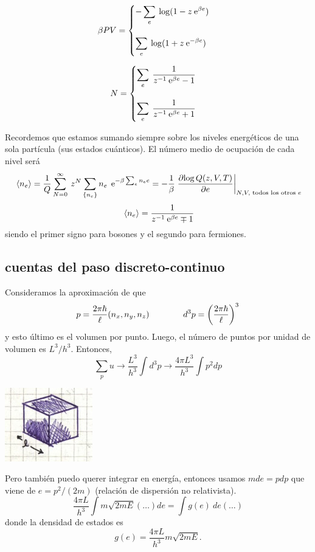 \documentclass[10pt,oneside]{CBFT_book}
\begin{document}
\[
	\beta P V = \begin{cases}
		\displaystyle - \sum_e \: \log ( 1-z\:\mathrm{e}^{\beta e} ) \\
		\\
		\displaystyle \sum_e \: \log( 1 + z\:\mathrm{e}^{-\beta e} )
	\end{cases}
\]

\[
	N = \begin{cases}
		\displaystyle \sum_e \: \frac{1}{z^{-1}\:\mathrm{e}^{\beta e} - 1 } \\
		\\
		\displaystyle \sum_e \: \frac{1}{z^{-1}\:\mathrm{e}^{\beta e} + 1 }
	\end{cases}
\]

Recordemos que estamos sumando siempre sobre los niveles energéticos de una sola partícula (sus estados
cuánticos). El número medio de ocupación de cada nivel será
\[
	\:\left\langle n_e \right\rangle = \frac{1}{Q} \sum_{N=0}^\infty \: z^N \sum_{ \{ n_e\} } n_e \: \:\mathrm{e}^{ -\beta \sum_e n_e e }
	= - \frac{1}{\beta} \left.\frac{\partial^{\hspace{-0.05em}} { \log Q(z,V,T) }}{\partial {e}^{\hspace{-0.05em}}}\right|_{N,V,\text{ todos los otros $e$}} 
\]
\[
	\:\left\langle n_e \right\rangle = \frac{ 1 }{ z^{-1} \:\mathrm{e}^{ \beta e } \mp 1 }
\]
siendo el primer signo para bosones y el segundo para fermiones.

\subsection{cuentas del paso discreto-continuo}

Consideramos la aproximación de que
\[
	p = \frac{2\pi\hbar}{\ell}( n_x, n_y, n_z ) \qquad \qquad 
	d^3p = \left( \frac{ 2\pi\hbar }{ \ell } \right)^3
\]
y esto último es el volumen por punto. Luego, el número de puntos por unidad de volumen es $ L^3/h^3 $.
Entonces,
\[
	\sum_p u  \longrightarrow \frac{L^3}{h^3} \int d^3p \longrightarrow  \frac{4 \pi L^3}{h^3} \int p^2 dp
\]

\includegraphics[scale=0.5]{images/1606329596.jpg}

Pero también puedo querer integrar en energía, entonces usamos $ m de = p dp $ que viene de $ e = p^2 / (2m)$
(relación de dispersión no relativista).
\[
	\frac{4 \pi L}{h^3} \int m \sqrt{ 2 m E } (\ldots) de = \int g(e) \: de (\ldots)
\]
donde la densidad de estados es
\[
	g(e) = \frac{4 \pi L}{h^3} m \sqrt{2 m E }.
\]
\end{document}
